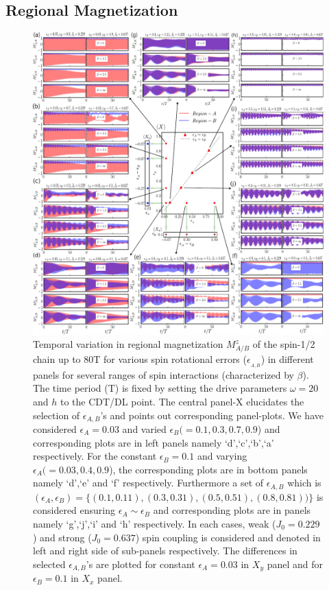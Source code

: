 \documentclass[12pt]{iopart}
\begin{document}
\subsection{\label{sec:level42} Regional Magnetization}
\begin{figure}[t]
	\centering
	\includegraphics[width = 15.0cm]{figure8.pdf}
	\caption{Temporal variation in regional magnetization $M^z_{A/B}$ of the spin-1/2 chain up to 80T for various spin rotational errors ($\epsilon_{_{A,B}}$) in different panels for  several ranges of spin interactions (characterized by $\beta$). The time period (T) is fixed by setting the drive parameters $\omega=20$ and $h$ to the CDT/DL point. The central panel-X elucidates the selection of $\epsilon_{A,B}$'s and points out corresponding panel-plots. We have considered $\epsilon_A = 0.03$ and varied $\epsilon_B(= 0.1, 0.3, 0.7,0.9$) and corresponding plots are in left panels namely `d',`c',`b',`a' respectively.  For the constant $\epsilon_B = 0.1$ and varying $\epsilon_A ( = 0.03, 0.4,0.9$), the corresponding plots are in bottom panels namely `d',`e' and `f' respectively. Furthermore a set of $\epsilon_{A,B}$ which is $ (\epsilon_{A},\epsilon_{B}) = \{(0.1,0.11), (0.3,0.31),(0.5,0.51),(0.8,0.81))\}$ is considered ensuring $\epsilon_A\sim \epsilon_B$ and corresponding plots are in panels namely `g',`j',`i' and `h' respectively. In each cases, weak ($J_0 = 0.229$) and strong ($J_0 = 0.637$) spin coupling  is considered and denoted in left and right side of sub-panels respectively. The differences in selected $\epsilon_{A,B}$'s are plotted for constant $\epsilon_A = 0.03$ in $X_y$ panel and for $\epsilon_B = 0.1$ in $X_x$ panel.}
	\label{Fig:reg_mag_ea_eb}
\end{figure}
\end{document}
